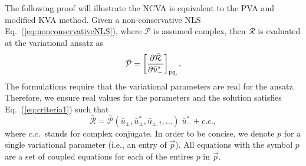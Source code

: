 The following proof will illustrate the NCVA is equivalent to the PVA and modified KVA method.  Given a non-conservative NLS Eq.~(\ref{eq:nonconservativeNLS}), 
where $\mathcal{P}$ is assumed complex, then $\mathcal{R}$ is 
evaluated at the variational ansatz as 
\begin{equation}
\bar{\mathcal{P}} = \left[ \frac{\partial \bar{\mathcal{R}}}{\partial {\bar{u}}_-^*} \right]_{\rm PL}.
\label{eq:criteria1}
\end{equation}
The formulations require that the variational parameters are real for the ansatz.  Therefore, we ensure real values for the parameters and the solution satisfies Eq.~(\ref{eq:criteria1}) such that  
\begin{equation}
\bar{\mathcal{R}} =
\bar{\mathcal{P}}(\bar{u}_{\pm}, \bar{u}_{\pm}^*,\bar{u}_{\pm,t},\ldots) \; 
\bar{u}_-^*  +  c.c.,
\end{equation}
where $c.c.$~stands for complex conjugate.  In order to be concise, we denote $p$ for a single variational parameter (i.e., an entry of $\vec{p}$).  All equations with the symbol $p$ are a set of coupled equations for each of the entires $p$ in $\vec{p}$.  

